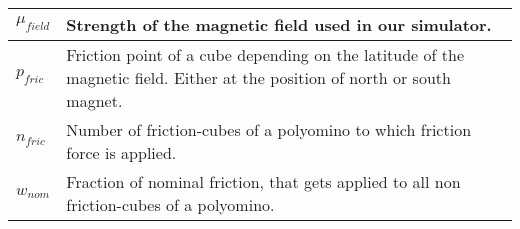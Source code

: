 \begin{xltabular}{\textwidth}{ l  X }
	$\mu_\textit{field}$
	&
	Strength of the magnetic field used in our simulator.
	\\ \midrule
	
	$p_\textit{fric}$
	&
	Friction point of a cube depending on the latitude of the magnetic field.
	Either at the position of north or south magnet.
	\\ \midrule
	
	$n_\textit{fric}$
	&
	Number of friction-cubes of a polyomino to which friction force is applied.
	\\ \midrule
	
	$w_\textit{nom}$
	&
	Fraction of nominal friction, that gets applied to all non friction-cubes of a polyomino.
	\\ \bottomrule
	
\end{xltabular}